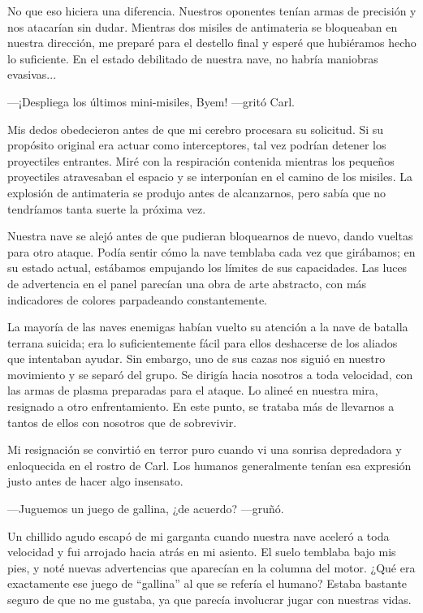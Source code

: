 \documentclass[spanish,12pt,a4paper,oneside,titlepage]{book}
\begin{document}
    No que eso hiciera una diferencia. Nuestros oponentes tenían armas de precisión y nos atacarían sin dudar. Mientras dos misiles de antimateria se bloqueaban en nuestra dirección, me preparé para el destello final y esperé que hubiéramos hecho lo suficiente. En el estado debilitado de nuestra nave, no habría maniobras evasivas...

    —¡Despliega los últimos mini-misiles, Byem! —gritó Carl.

    Mis dedos obedecieron antes de que mi cerebro procesara su solicitud. Si su propósito original era actuar como interceptores, tal vez podrían detener los proyectiles entrantes. Miré con la respiración contenida mientras los pequeños proyectiles atravesaban el espacio y se interponían en el camino de los misiles. La explosión de antimateria se produjo antes de alcanzarnos, pero sabía que no tendríamos tanta suerte la próxima vez.

    Nuestra nave se alejó antes de que pudieran bloquearnos de nuevo, dando vueltas para otro ataque. Podía sentir cómo la nave temblaba cada vez que girábamos; en su estado actual, estábamos empujando los límites de sus capacidades. Las luces de advertencia en el panel parecían una obra de arte abstracto, con más indicadores de colores parpadeando constantemente.

    La mayoría de las naves enemigas habían vuelto su atención a la nave de batalla terrana suicida; era lo suficientemente fácil para ellos deshacerse de los aliados que intentaban ayudar. Sin embargo, uno de sus cazas nos siguió en nuestro movimiento y se separó del grupo. Se dirigía hacia nosotros a toda velocidad, con las armas de plasma preparadas para el ataque. Lo alineé en nuestra mira, resignado a otro enfrentamiento. En este punto, se trataba más de llevarnos a tantos de ellos con nosotros que de sobrevivir.

    Mi resignación se convirtió en terror puro cuando vi una sonrisa depredadora y enloquecida en el rostro de Carl. Los humanos generalmente tenían esa expresión justo antes de hacer algo insensato.

    —Juguemos un juego de gallina, ¿de acuerdo? —gruñó.

    Un chillido agudo escapó de mi garganta cuando nuestra nave aceleró a toda velocidad y fui arrojado hacia atrás en mi asiento. El suelo temblaba bajo mis pies, y noté nuevas advertencias que aparecían en la columna del motor. ¿Qué era exactamente ese juego de ``gallina'' al que se refería el humano? Estaba bastante seguro de que no me gustaba, ya que parecía involucrar jugar con nuestras vidas.
\end{document}
